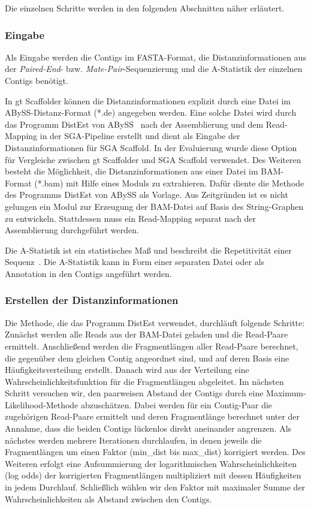 \documentclass[a4paper,11pt,parskip,abstract=on]{scrartcl}
\begin{document}
Die einzelnen Schritte werden in den folgenden Abschnitten näher erläutert.

\subsubsection{Eingabe}
Als Eingabe werden die Contigs im FASTA-Format, die
Distanzinformationen aus der \textit{Paired-End}-
bzw. \textit{Mate-Pair}-Sequenzierung und die A-Statistik der einzelnen
Contigs benötigt.

In gt Scaffolder können die Distanzinformationen explizit durch eine
Datei im ABySS-Distanz-Format (*.de) angegeben werden. Eine solche
Datei wird durch das Programm DistEst von ABySS~\cite{abyss} nach der Assemblierung
und dem Read-Mapping in der SGA-Pipeline erstellt und dient als
Eingabe der Distanzinformationen für SGA Scaffold. In der Evaluierung
wurde diese Option für Vergleiche zwischen gt Scaffolder und SGA Scaffold
verwendet. Des Weiteren besteht die Möglichkeit, die Distanzinformationen aus
einer Datei im BAM-Format (*.bam) mit Hilfe eines Moduls zu
extrahieren. Dafür diente die Methode des Programms DistEst von ABySS
als Vorlage. Aus Zeitgründen ist es nicht gelungen ein Modul zur Erzeugung
der BAM-Datei auf Basis des String-Graphen zu entwickeln.
Stattdessen muss ein Read-Mapping separat nach der Assemblierung
durchgeführt werden.

Die A-Statistik ist ein statistisches Maß und beschreibt die Repetitivität
einer Sequenz~\cite{Myers:2005iq}. Die A-Statistik kann in Form einer
separaten Datei oder als Annotation in den Contigs angeführt werden.

\subsubsection{Erstellen der Distanzinformationen} Die Methode, die das
Programm DistEst verwendet, durchläuft folgende Schritte: Zunächst werden alle
Reads aus der BAM-Datei geladen und die Read-Paare ermittelt. Anschließend
werden die Fragmentlängen aller Read-Paare berechnet, die gegenüber dem
gleichen Contig angeordnet sind, und auf deren Basis eine
Häufigkeitsverteilung erstellt. Danach wird aus der Verteilung eine
Wahrscheinlichkeitsfunktion für die Fragmentlängen abgeleitet. Im nächsten
Schritt versuchen wir, den paarweisen Abstand der Contigs durch eine Maximum-
Likelihood-Methode abzuschätzen. Dabei werden für ein Contig-Paar die
zugehörigen Read-Paare ermittelt und deren Fragmentlänge berechnet unter der
Annahme, dass die beiden Contigs lückenlos direkt aneinander angrenzen. Als
nächstes werden mehrere Iterationen durchlaufen, in denen jeweils die
Fragmentlängen um einen Faktor (min\_dist bis max\_dist) korrigiert werden.
Des Weiteren erfolgt eine Aufsummierung der logarithmischen
Wahrscheinlichkeiten (log odds) der korrigierten Fragmentlängen multipliziert
mit dessen Häufigkeiten in jedem Durchlauf. Schließlich wählen wir den Faktor
mit maximaler Summe der Wahrscheinlichkeiten als Abstand zwischen den Contigs.
\end{document}
